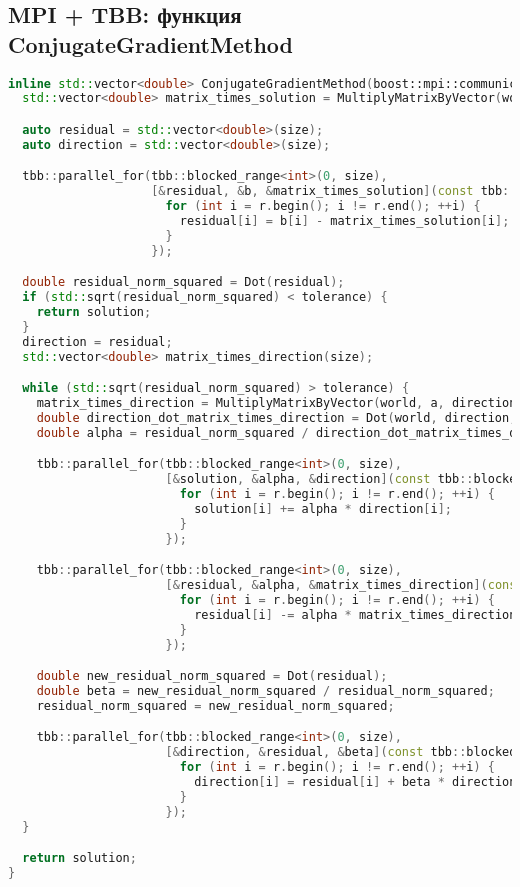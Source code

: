 \documentclass[12pt]{article}
\begin{document}
\subsection*{MPI + TBB: функция ConjugateGradientMethod}
\begin{lstlisting}[language=C++]
inline std::vector<double> ConjugateGradientMethod(boost::mpi::communicator& world, std::vector<double>& a, std::vector<double>& b, std::vector<double> solution, double tolerance, int size) {
  std::vector<double> matrix_times_solution = MultiplyMatrixByVector(world, a, solution, size);

  auto residual = std::vector<double>(size);
  auto direction = std::vector<double>(size);

  tbb::parallel_for(tbb::blocked_range<int>(0, size),
                    [&residual, &b, &matrix_times_solution](const tbb::blocked_range<int>& r) {
                      for (int i = r.begin(); i != r.end(); ++i) {
                        residual[i] = b[i] - matrix_times_solution[i];
                      }
                    });

  double residual_norm_squared = Dot(residual);
  if (std::sqrt(residual_norm_squared) < tolerance) {
    return solution;
  }
  direction = residual;
  std::vector<double> matrix_times_direction(size);

  while (std::sqrt(residual_norm_squared) > tolerance) {
    matrix_times_direction = MultiplyMatrixByVector(world, a, direction, size);
    double direction_dot_matrix_times_direction = Dot(world, direction, matrix_times_direction);
    double alpha = residual_norm_squared / direction_dot_matrix_times_direction;

    tbb::parallel_for(tbb::blocked_range<int>(0, size),
                      [&solution, &alpha, &direction](const tbb::blocked_range<int>& r) {
                        for (int i = r.begin(); i != r.end(); ++i) {
                          solution[i] += alpha * direction[i];
                        }
                      });

    tbb::parallel_for(tbb::blocked_range<int>(0, size),
                      [&residual, &alpha, &matrix_times_direction](const tbb::blocked_range<int>& r) {
                        for (int i = r.begin(); i != r.end(); ++i) {
                          residual[i] -= alpha * matrix_times_direction[i];
                        }
                      });

    double new_residual_norm_squared = Dot(residual);
    double beta = new_residual_norm_squared / residual_norm_squared;
    residual_norm_squared = new_residual_norm_squared;

    tbb::parallel_for(tbb::blocked_range<int>(0, size),
                      [&direction, &residual, &beta](const tbb::blocked_range<int>& r) {
                        for (int i = r.begin(); i != r.end(); ++i) {
                          direction[i] = residual[i] + beta * direction[i];
                        }
                      });
  }

  return solution;
}
\end{lstlisting}
\end{document}
